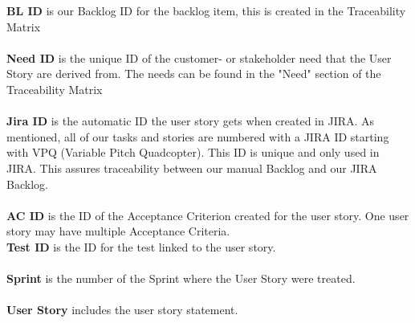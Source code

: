 \krav{}{}{}{}{}{}{}


\noindent \textbf{BL ID} is our Backlog ID for the backlog item, this is created in the Traceability Matrix \\ \\
\textbf{Need ID} is the unique ID of the customer- or stakeholder need that the User Story are derived from. The needs can be found in the "Need" section of the Traceability Matrix \\ \\
\textbf{Jira ID} is the automatic ID the user story gets when created in JIRA. As mentioned, all of our tasks and stories are numbered with a JIRA ID starting with VPQ (Variable Pitch Quadcopter). This ID is unique and only used in JIRA. This assures traceability between our manual Backlog and our JIRA Backlog. \\ \\
\textbf{AC ID} is the ID of the Acceptance Criterion created for the user story. One user story may have multiple Acceptance Criteria.  \\
\textbf{Test ID} is the ID for the test linked to the user story. \\ \\
\textbf{Sprint} is the number of the Sprint where the User Story were treated. \\ \\
\textbf{User Story} includes the user story statement. \\
\\
